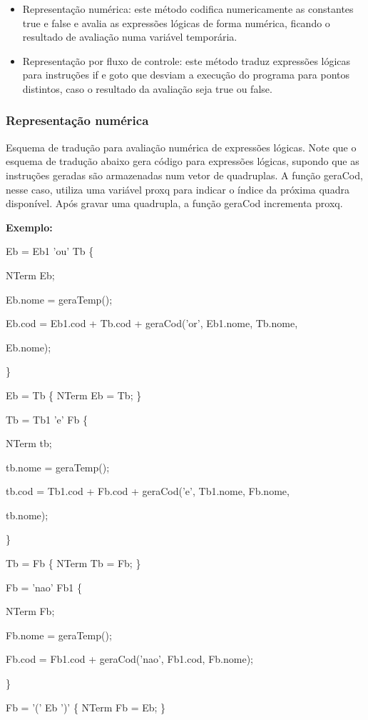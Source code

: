 \documentclass[11pt]{article}
\begin{document}
\begin{itemize}
\item Representação numérica: este método codifica numericamente as
constantes true e false e avalia as expressões lógicas de forma
numérica, ficando o resultado de avaliação numa variável
temporária.
\item Representação por fluxo de controle: este método traduz
expressões lógicas para instruções if e goto que desviam a
execução do programa para pontos distintos, caso o resultado da
avaliação seja true ou false.
\end{itemize}

\subsubsection{Representação numérica}
\label{sec:org1599202}
Esquema de tradução para avaliação numérica de expressões
lógicas. Note que o esquema de tradução abaixo gera código para
expressões lógicas, supondo que as instruções geradas são
armazenadas num vetor de quadruplas. A função geraCod, nesse caso,
utiliza uma variável proxq para indicar o índice da próxima quadra
disponível. Após gravar uma quadrupla, a função geraCod incrementa
proxq.

\textbf{Exemplo:}

Eb = Eb1 'ou' Tb \{

NTerm Eb;

Eb.nome = geraTemp();

Eb.cod = Eb1.cod + Tb.cod + geraCod('or', Eb1.nome, Tb.nome,

Eb.nome);

\}

Eb = Tb \{ NTerm Eb = Tb; \}

Tb = Tb1 'e' Fb \{

NTerm tb;

tb.nome = geraTemp();

tb.cod = Tb1.cod + Fb.cod + geraCod('e', Tb1.nome, Fb.nome,

tb.nome);

\}

Tb = Fb \{ NTerm Tb = Fb; \}

Fb = 'nao' Fb1 \{

NTerm Fb;

Fb.nome = geraTemp();

Fb.cod = Fb1.cod + geraCod('nao', Fb1.cod, Fb.nome);

\}

Fb = '(' Eb ')' \{ NTerm Fb = Eb; \}
\end{document}
